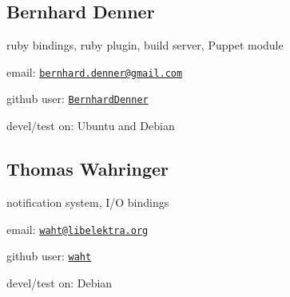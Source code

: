 \subsection*{Bernhard Denner}

ruby bindings, ruby plugin, build server, Puppet module


\begin{DoxyItemize}
\item email\+: \href{mailto:bernhard.denner@gmail.com}{\tt bernhard.\+denner@gmail.\+com}
\item github user\+: \href{https://github.com/BernhardDenner}{\tt Bernhard\+Denner}
\item devel/test on\+: Ubuntu and Debian
\end{DoxyItemize}

\subsection*{Thomas Wahringer}

notification system, I/O bindings


\begin{DoxyItemize}
\item email\+: \href{mailto:waht@libelektra.org}{\tt waht@libelektra.\+org}
\item github user\+: \href{https://github.com/waht}{\tt waht}
\item devel/test on\+: Debian 
\end{DoxyItemize}